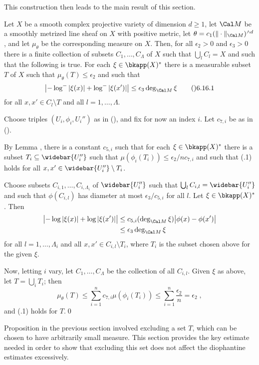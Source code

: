 This construction then leads to the main result of this section.

  Let $X$ be a smooth complex projective variety of
dimension $d\ge1$, let $\Cal M$ be a smoothly metrized line sheaf on $X$ with
positive metric, let\break%
$\theta=c_1(\|\cdot\|_{\Cal M})^{\wedge d}$,
and let $\mu_\theta$ be the corresponding measure on $X$.
Then, for all $\epsilon_2>0$ and $\epsilon_3>0$
there is a finite collection of subsets $C_1,\dots,C_\Lambda$ of $X$
such that $\bigcup_l C_l=X$ and such that the following is true.
For each $\xi\in\bkapp(X)^{*}$
there is a measurable subset $T$ of $X$ such that $\mu_\theta(T)\le\epsilon_2$
and such that
$$\bigl|-\log^{-}|\xi(x)|+\log^{-}|\xi(x')|\bigr|
  \le \epsilon_3\deg_{\Cal M}\xi
  \tag\06.16.1$$
for all $x,x'\in C_l\setminus T$ and all $l=1,\dots,\Lambda$.
\endit

  Choose triples $(U_i,\phi_i,U_i'')$ as in (),
and fix for now an index $i$.  Let $c_{7,i}$ be as in ().

By Lemma , there is a constant $c_{5,i}$ such that for each
$\xi\in\bkapp(X)^{*}$ there is a subset $T_i\subseteq\widebar{U_i''}$
such that $\mu(\phi_i(T_i))\le \epsilon_2/nc_{7,i}$ and such that
(.1) holds for all $x,x'\in\widebar{U_i''}\setminus T_i$.

Choose subsets $C_{i,1},\dots,C_{i,\Lambda_i}$ of $\widebar{U_i''}$
such that $\bigcup_l C_{i,l}=\widebar{U_i''}$ and such that $\phi(C_{i,l})$
has diameter at most $\epsilon_3/c_{5,i}$ for all $l$.
Let $\xi\in\bkapp(X)^{*}$.  Then
$$\split \bigl|-\log|\xi(x)|+\log|\xi(x')|\bigr|
  &\le c_{5,i}(\deg_{\Cal M}\xi) \bigl|\phi(x)-\phi(x')\bigr| \\
  &\le \epsilon_3\deg_{\Cal M}\xi \endsplit$$
for all $l=1,\dots,\Lambda_i$ and all $x,x'\in C_{i,l}\setminus T_i$,
where $T_i$ is the subset chosen above for the given $\xi$.

Now, letting $i$ vary, let $C_1,\dots,C_\Lambda$ be the collection of
all $C_{i,l}$.  Given $\xi$ as above, let $T=\bigcup_i T_i$; then
$$\mu_\theta(T) \le \sum_{i=1}^n c_{7,i}\mu(\phi_i(T_i))
  \le \sum_{i=1}^n \frac{\epsilon_2}{n} = \epsilon_2\;,$$
and (.1) holds for $T$.\qed
\enddemo


Proposition  in the previous section involved excluding a set $T$,
which can be chosen to have arbitrarily small measure.  This section
provides the key estimate needed in order to show that excluding this set
does not affect the diophantine estimates excessively.

